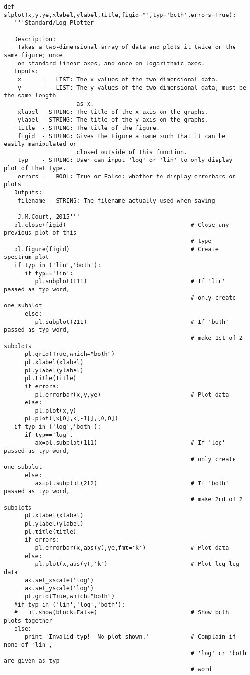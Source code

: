 \begin{verbatim}
def slplot(x,y,ye,xlabel,ylabel,title,figid="",typ='both',errors=True):
   '''Standard/Log Plotter

   Description:
    Takes a two-dimensional array of data and plots it twice on the same figure; once
    on standard linear axes, and once on logarithmic axes.
   Inputs:
    x      -   LIST: The x-values of the two-dimensional data.
    y      -   LIST: The y-values of the two-dimensional data, must be the same length
                     as x.
    xlabel - STRING: The title of the x-axis on the graphs.
    ylabel - STRING: The title of the y-axis on the graphs.
    title  - STRING: The title of the figure.
    figid  - STRING: Gives the Figure a name such that it can be easily manipulated or
                     closed outside of this function.
    typ    - STRING: User can input 'log' or 'lin' to only display plot of that type.
    errors -   BOOL: True or False: whether to display errorbars on plots
   Outputs:
    filename - STRING: The filename actually used when saving

   -J.M.Court, 2015'''
   pl.close(figid)                                    # Close any previous plot of this
                                                      # type
   pl.figure(figid)                                   # Create spectrum plot
   if typ in ('lin','both'):
      if typ=='lin':
         pl.subplot(111)                              # If 'lin' passed as typ word,
                                                      # only create one subplot
      else:
         pl.subplot(211)                              # If 'both' passed as typ word, 
                                                      # make 1st of 2 subplots
      pl.grid(True,which="both")
      pl.xlabel(xlabel)
      pl.ylabel(ylabel)
      pl.title(title)
      if errors:
         pl.errorbar(x,y,ye)                          # Plot data
      else:
         pl.plot(x,y)
      pl.plot([x[0],x[-1]],[0,0])
   if typ in ('log','both'):
      if typ=='log':
         ax=pl.subplot(111)                           # If 'log' passed as typ word,
                                                      # only create one subplot
      else:
         ax=pl.subplot(212)                           # If 'both' passed as typ word, 
                                                      # make 2nd of 2 subplots
      pl.xlabel(xlabel)
      pl.ylabel(ylabel)
      pl.title(title)
      if errors:
         pl.errorbar(x,abs(y),ye,fmt='k')             # Plot data
      else:
         pl.plot(x,abs(y),'k')                        # Plot log-log data
      ax.set_xscale('log')
      ax.set_yscale('log')
      pl.grid(True,which="both")
   #if typ in ('lin','log','both'):
   #   pl.show(block=False)                           # Show both plots together
   else:
      print 'Invalid typ!  No plot shown.'            # Complain if none of 'lin',
                                                      # 'log' or 'both are given as typ
                                                      # word


\end{verbatim}
